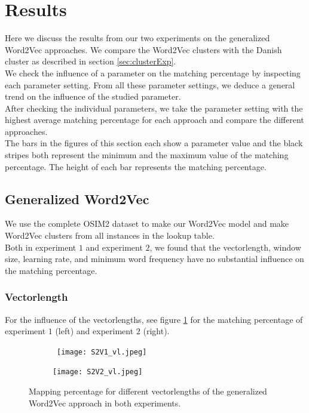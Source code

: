 \section{Results}
\label{sec:expResults}

Here we discuss the results from our two experiments on the generalized Word2Vec approaches. We compare the Word2Vec clusters with the Danish cluster as described in section \ref{sec:clusterExp}. \\
We check the influence of a parameter on the matching percentage by inspecting each parameter setting. From all these parameter settings, we deduce a general trend on the influence of the studied parameter. \\
After checking the individual parameters, we take the parameter setting with the highest average matching percentage for each approach and compare the different approaches. \\

The bars in the figures of this section each show a parameter value and the black stripes both represent the minimum and the maximum value of the matching percentage. The height of each bar represents the matching percentage.

\subsection{Generalized Word2Vec}

We use the complete OSIM2 dataset to make our Word2Vec model and make Word2Vec clusters from all instances in the lookup table. \\
Both in experiment $1$ and experiment $2$, we found that the vectorlength, window size, learning rate, and minimum word frequency have no substantial influence on the matching percentage. 

\subsubsection{Vectorlength}

For the influence of the vectorlengths, see figure \ref{fig:s2v_vl} for the matching percentage of experiment $1$ (left) and experiment $2$ (right). \\

\begin{figure}[!htb]
	\centering
	\begin{subfigure}[b]{.49\textwidth}\
		\texttt{[image: S2V1\_vl.jpeg]}
	\end{subfigure}
	\begin{subfigure}[b]{.49\textwidth}
		\texttt{[image: S2V2\_vl.jpeg]}
	\end{subfigure}
	\caption{Mapping percentage for different vectorlengths of the generalized Word2Vec 		approach in both experiments.}
	\label{fig:s2v_vl}
\end{figure}

